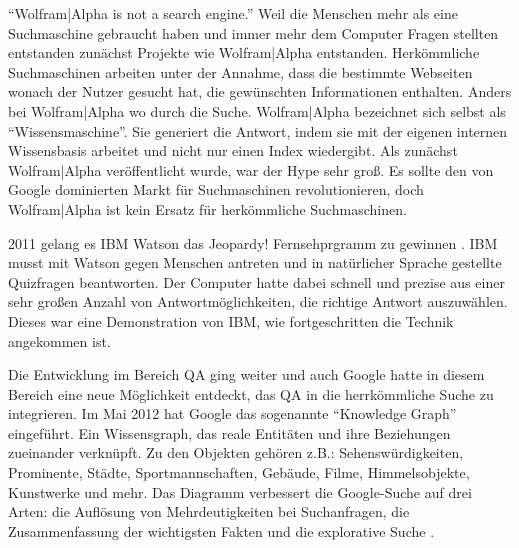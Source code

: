 \documentclass[../Masterarbeit.tex]{subfiles}
\begin{document}
\enquote{Wolfram|Alpha is not a search engine.} \citep{WolframAlpha} Weil die Menschen mehr als eine Suchmaschine gebraucht haben und immer mehr dem Computer Fragen stellten entstanden zunächst Projekte wie Wolfram|Alpha entstanden. Herkömmliche Suchmaschinen arbeiten unter der Annahme, dass die bestimmte Webseiten wonach der Nutzer gesucht hat, die gewünschten Informationen enthalten. Anders bei Wolfram|Alpha wo durch die Suche. Wolfram|Alpha bezeichnet sich selbst als \enquote{Wissensmaschine}. Sie generiert die Antwort, indem sie mit der eigenen internen Wissensbasis arbeitet und nicht nur einen Index wiedergibt. Als zunächst Wolfram|Alpha veröffentlicht wurde, war der Hype sehr groß. Es sollte den von Google dominierten Markt für Suchmaschinen revolutionieren, doch Wolfram|Alpha ist kein Ersatz für herkömmliche Suchmaschinen.

2011 gelang es IBM Watson das Jeopardy! Fernsehprgramm zu gewinnen \citep{Markoff2011ComputerNot}. IBM musst mit Watson gegen Menschen antreten und in natürlicher Sprache gestellte Quizfragen beantworten. Der Computer hatte dabei schnell und prezise aus einer sehr großen Anzahl von Antwortmöglichkeiten, die richtige Antwort auszuwählen. Dieses war eine Demonstration von IBM, wie fortgeschritten die Technik angekommen ist.

Die Entwicklung im Bereich QA ging weiter und auch Google hatte in diesem Bereich eine neue Möglichkeit entdeckt, das QA in die herrkömmliche Suche zu integrieren. Im Mai 2012 hat Google das sogenannte \enquote{Knowledge Graph} eingeführt. Ein Wissensgraph, das reale Entitäten und ihre Beziehungen zueinander verknüpft. Zu den Objekten gehören z.B.: Sehenswürdigkeiten, Prominente, Städte, Sportmannschaften, Gebäude, Filme, Himmelsobjekte, Kunstwerke und mehr. Das Diagramm verbessert die Google-Suche auf drei Arten: die Auflösung von Mehrdeutigkeiten bei Suchanfragen, die Zusammenfassung der wichtigsten Fakten und die explorative Suche \citep{SteinerAddingGraph}.
\end{document}
